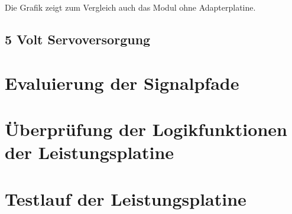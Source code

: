 Die Grafik zeigt zum Vergleich auch das Modul ohne Adapterplatine.

\subsection{5 Volt Servoversorgung}

\section{Evaluierung der Signalpfade}

\section{Überprüfung der Logikfunktionen der Leistungsplatine}

\section{Testlauf der Leistungsplatine}